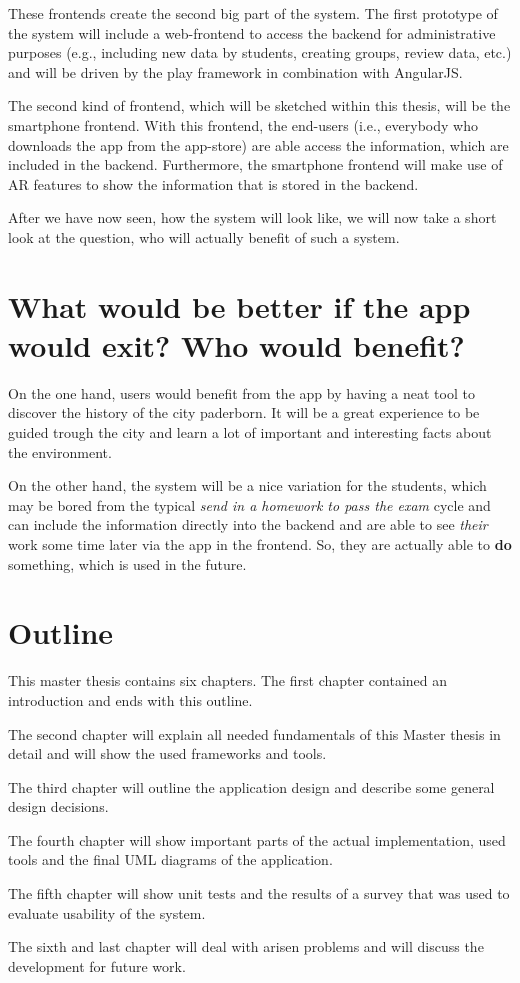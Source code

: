 These frontends create the second big part of the system. The first prototype of the system will include a web-frontend to access the backend for administrative purposes (e.g., including new data by students, creating groups, review data, etc.) and will be driven by the play framework in combination with AngularJS. 

The second kind of frontend, which will be sketched within this thesis, will be the smartphone frontend. With this frontend, the end-users (i.e., everybody who downloads the app from the app-store) are able access the information, which are included in the backend. Furthermore, the smartphone frontend will make use of \ac{AR} features to show the information that is stored in the backend. 

After we have now seen, how the system will look like, we will now take a short look at the question, who will actually benefit of such a system.   

\section{What would be better if the app would exit? Who would benefit?}
On the one hand, users would benefit from the app by having a neat tool to discover the history of the city paderborn. It will be a great experience to be guided trough the city and learn a lot of important and interesting facts about the environment. 

On the other hand, the system will be a nice variation for the students, which may be bored from the typical \textit{send in a homework to pass the exam} cycle and can include the information directly into the backend and are able to see \textit{their} work some time later via the app in the frontend. So, they are actually able to \textbf{do} something, which is used in the future.    

\section{Outline}
This master thesis contains six chapters. The first chapter contained an introduction and ends with this outline.

The second chapter will explain all needed fundamentals of this Master thesis in detail and will show the used frameworks and tools.

The third chapter will outline the application design and describe some general design decisions.

The fourth chapter will show important parts of the actual implementation, used tools and the final \acf{UML} diagrams of the application.

The fifth chapter will show unit tests and the results of a survey that was used to evaluate usability of the system. 

The sixth and last chapter will deal with arisen problems and will discuss the development for future work.
